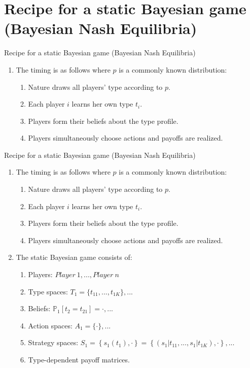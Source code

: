 \section{Recipe for a static Bayesian game (Bayesian Nash Equilibria)}

\begin{frame}{Recipe for a static Bayesian game (Bayesian Nash Equilibria)}
    \begin{enumerate}
      \item The timing is as follows where $p$ is a commonly known distribution:
      \begin{enumerate}\normalsize
        \item Nature draws all players' type according to $p$.
        \item Each player $i$ learns her own type $t_{i}$.
        \item Players form their beliefs about the type profile.
        \item Players simultaneously choose actions and payoffs are realized.
      \end{enumerate}
    \end{enumerate}
    \vfill\null
\end{frame}
\begin{frame}{Recipe for a static Bayesian game (Bayesian Nash Equilibria)}
    \begin{enumerate}
      \item The timing is as follows where $p$ is a commonly known distribution:
      \begin{enumerate}\normalsize
        \item Nature draws all players' type according to $p$.
        \item Each player $i$ learns her own type $t_{i}$.
        \item Players form their beliefs about the type profile.
        \item Players simultaneously choose actions and payoffs are realized.
      \end{enumerate}
      \item The static Bayesian game consists of:
      \begin{enumerate}\normalsize
        \item Players: $Player\ 1,...,Player\ n$
        \item Type spaces: $T_1=\{t_{11},...,t_{1K}\},...$
        \item Beliefs: $\mathbb{P}_1[t_2=t_{21}]=\cdot,...$
        \item Action spaces: $A_1=\{\cdot\},...$
        \item Strategy spaces: $S_1=\left\{s_1(t_1),\cdot\right\}=\left\{(s_1|t_{11},...,s_1|t_{1K}),\cdot\right\},...$
        \item Type-dependent payoff matrices.
      \end{enumerate}
    \end{enumerate}
    \vfill\null
\end{frame}
